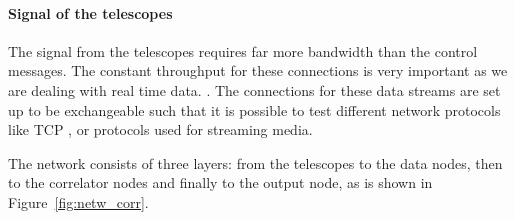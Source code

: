 \paragraph{Signal of the telescopes}
The signal from the telescopes requires far more bandwidth than the
control messages. The constant throughput for these connections is
very important as we are dealing with real time data. . The connections for these data streams are set up to be
exchangeable such that it is possible to test different network
protocols like TCP , 
or protocols used for streaming media. 

The network consists of three layers: from the
telescopes to the data nodes, then to the correlator nodes and finally
to the output node, as is shown in
Figure~\ref{fig:netw_corr}.



